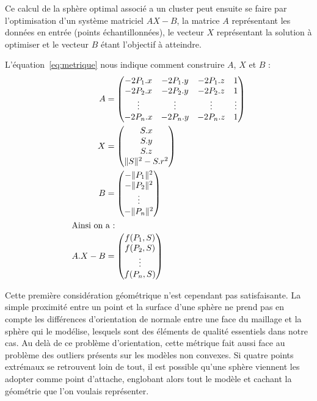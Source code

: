 \documentclass[10pt,a4paper,twoside, twocolumn]{report}
\begin{document}
Ce calcul de la sphère optimal associé a un cluster peut ensuite se faire par l'optimisation d'un système matriciel $AX-B$, la matrice $A$ représentant les données en entrée (points échantillonnées), le vecteur $X$ représentant la solution à optimiser et le vecteur $B$ étant l'objectif à atteindre.

L'équation~\ref{eq:metrique} nous indique comment construire $A$, $X$ et $B$ :
\begin{subequations}
\begin{align}
		A	&=	\begin{pmatrix}
						-2P_1.x & -2P_1.y & -2P_1.z & 1 			\\
						-2P_2.x & -2P_2.y & -2P_2.z & 1 			\\
						\vdots	& \vdots	&	\vdots	& \vdots	\\
						-2P_n.x & -2P_n.y & -2P_n.z & 1
					\end{pmatrix}																												\\
		X &=	\begin{pmatrix} S.x \\ S.y \\ S.z \\ \|S\|^2 - S.r^2 \end{pmatrix}	\\
		B	&=	\begin{pmatrix}
						-\|P_1\|^2	\\
						-\|P_2\|^2	\\
						\vdots			\\
						-\|P_n\|^2
					\end{pmatrix}																												\\
\intertext{Ainsi on a :}
	A.X-B &= \begin{pmatrix}
						f(P_1, S)	\\
						f(P_2, S)	\\
						\vdots		\\
						f(P_n, S)
					\end{pmatrix}
\end{align}
\end{subequations}

Cette première considération géométrique n'est cependant pas satisfaisante. La simple proximité entre un point et la surface d'une sphère ne prend pas en compte les différences d'orientation de normale entre une face du maillage et la sphère qui le modélise, lesquels sont des éléments de qualité essentiels dans notre cas. Au delà de ce problème d'orientation, cette métrique fait aussi face au problème des outliers présents sur les modèles non convexes. Si quatre points extrémaux se retrouvent loin de tout, il est possible qu'une sphère viennent les adopter comme point d'attache, englobant alors tout le modèle et cachant la géométrie que l'on voulais représenter.
\end{document}
